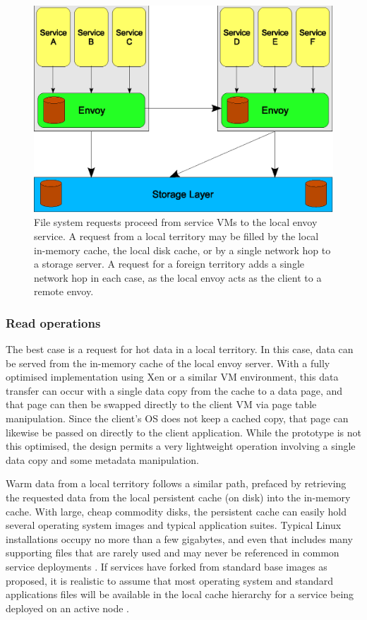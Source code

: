 \begin{figure}[t]
\centering
\includegraphics[width=\figwidth]{figures/hops}
\caption[Network paths taken by typical file requests]{File system requests proceed from service VMs to the local envoy service. A request from a local territory may be filled by the local in-memory cache, the local disk cache, or by a single network hop to a storage server. A request for a foreign territory adds a single network hop in each case, as the local envoy acts as the client to a remote envoy.}
\label{fig:hops}
\end{figure}

\subsubsection{Read operations}\label{sec:data-paths-read}

The best case is a request for hot data in a local territory. In this case, data can be served from the in-memory cache of the local envoy server. With a fully optimised implementation using Xen or a similar VM environment, this data transfer can occur with a single data copy from the cache to a data page, and that page can then be swapped directly to the client VM via page table manipulation. Since the client's OS does not keep a cached copy, that page can likewise be passed on directly to the client application. While the prototype is not this optimised, the design permits a very lightweight operation involving a single data copy and some metadata manipulation.

Warm data from a local territory follows a similar path, prefaced by retrieving the requested data from the local persistent cache (on disk) into the in-memory cache. With large, cheap commodity disks, the persistent cache can easily hold several operating system images and typical application suites. Typical Linux installations occupy no more than a few gigabytes, and even that includes many supporting files that are rarely used and may never be referenced in common service deployments \cite{gibson98b}. If services have forked from standard base images as proposed, it is realistic to assume that most operating system and standard applications files will be available in the local cache hierarchy for a service being deployed on an active node \cite{klosterman}.

